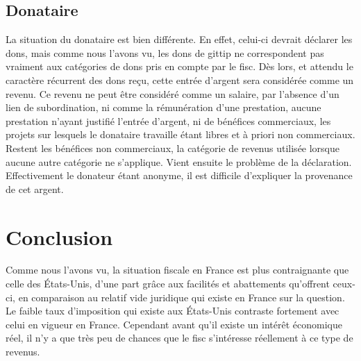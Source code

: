         \subsection{Donataire}
            La situation du donataire est bien différente. En effet, celui-ci
            devrait déclarer les dons, mais comme nous l'avons vu, les dons
            de gittip ne correspondent pas vraiment aux catégories de dons
            pris en compte par le fisc. Dès lors, et attendu le caractère
            récurrent des dons reçu, cette entrée d'argent sera considérée
            comme un revenu. Ce revenu ne peut être considéré comme un
            salaire, par l'absence d'un lien de subordination, ni comme la
            rémunération d'une prestation, aucune prestation n'ayant
            justifié l'entrée d'argent, ni de bénéfices commerciaux, les
            projets sur lesquels le donataire travaille étant libres et
            à priori non commerciaux. Restent les bénéfices non commerciaux,
            la catégorie de revenus utilisée lorsque aucune autre catégorie
            ne s'applique. Vient ensuite le problème de la déclaration.
            Effectivement le donateur étant anonyme, il est difficile
            d'expliquer la provenance de cet argent.

    \section{Conclusion}
        Comme nous l'avons vu, la situation fiscale en France est plus
        contraignante que celle des États-Unis, d'une part grâce aux
        facilités et abattements qu'offrent ceux-ci, en comparaison
        au relatif vide juridique qui existe en France sur la question.
        Le faible taux d'imposition qui existe aux États-Unis contraste
        fortement avec celui en vigueur en France. Cependant avant qu'il
        existe un intérêt économique réel, il n'y a que très peu de
        chances que le fisc s'intéresse réellement à ce type de revenus.

